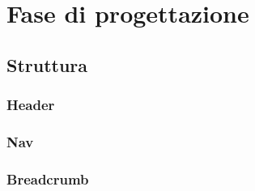 \section{Fase di progettazione}
\label{sec:fase_di_progettazione}
\subsection{Struttura}
\label{sub:struttura}
\subsubsection{Header}
\label{ssub:header}
\subsubsection{Nav}
\label{ssub:nav}
\subsubsection{Breadcrumb}
\label{ssub:breadcrumb}
